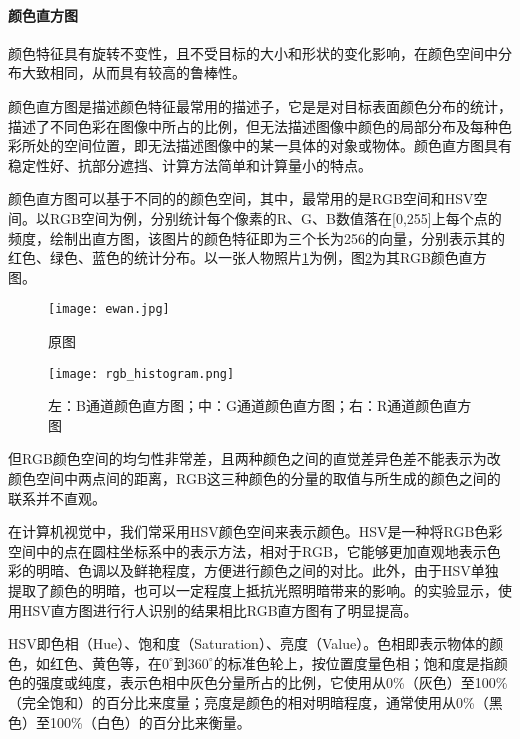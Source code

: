 \paragraph{颜色直方图}

  颜色特征具有旋转不变性，且不受目标的大小和形状的变化影响，在颜色空间中分布大致相同，从而具有较高的鲁棒性。

  颜色直方图是描述颜色特征最常用的描述子，它是是对目标表面颜色分布的统计，描述了不同色彩在图像中所占的比例，但无法描述图像中颜色的局部分布及每种色彩所处的空间位置，即无法描述图像中的某一具体的对象或物体。颜色直方图具有稳定性好、抗部分遮挡、计算方法简单和计算量小的特点。

  颜色直方图可以基于不同的的颜色空间，其中，最常用的是RGB空间和HSV空间。以RGB空间为例，分别统计每个像素的R、G、B数值落在[0,255]上每个点的频度，绘制出直方图，该图片的颜色特征即为三个长为256的向量，分别表示其的红色、绿色、蓝色的统计分布。以一张人物照片\ref{fig:ewan}为例，图\ref{fig:rgbhistogram}为其RGB颜色直方图。

\begin{figure}[htb]
  \centering
  \texttt{[image: ewan.jpg]}
  \caption{原图}
  \label{fig:ewan}
\end{figure}

\begin{figure}[htb]
  \centering
  \texttt{[image: rgb\_histogram.png]}
  \caption{左：B通道颜色直方图；中：G通道颜色直方图；右：R通道颜色直方图}
  \label{fig:rgbhistogram}
\end{figure}

  但RGB颜色空间的均匀性非常差，且两种颜色之间的直觉差异色差不能表示为改颜色空间中两点间的距离，RGB这三种颜色的分量的取值与所生成的颜色之间的联系并不直观。

  在计算机视觉中，我们常采用HSV颜色空间来表示颜色。HSV是一种将RGB色彩空间中的点在圆柱坐标系中的表示方法，相对于RGB，它能够更加直观地表示色彩的明暗、色调以及鲜艳程度，方便进行颜色之间的对比。此外，由于HSV单独提取了颜色的明暗，也可以一定程度上抵抗光照明暗带来的影响。\citet{sural2002segmentation}的实验显示，使用HSV直方图进行行人识别的结果相比RGB直方图有了明显提高。

  HSV即色相（Hue）、饱和度（Saturation）、亮度（Value）。色相即表示物体的颜色，如红色、黄色等，在$0^{\circ}$到$360^{\circ}$的标准色轮上，按位置度量色相；饱和度是指颜色的强度或纯度，表示色相中灰色分量所占的比例，它使用从0\%（灰色）至100\%（完全饱和）的百分比来度量；亮度是颜色的相对明暗程度，通常使用从0\%（黑色）至100\%（白色）的百分比来衡量。

